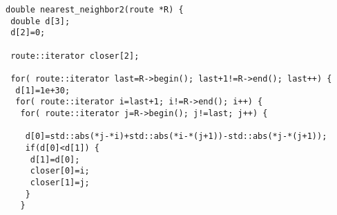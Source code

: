 \documentclass[a4paper, 12pt]{article}
\begin{document}
{\small
\begin{verbatim}
double nearest_neighbor2(route *R) {                                                                                                                            
 double d[3];                                                                                                                                                   
 d[2]=0;                                                                                                                                                        
                                                                                                                                                                
 route::iterator closer[2];                                                                                                                                     
                                                                                                                                                                
 for( route::iterator last=R->begin(); last+1!=R->end(); last++) {                                                                                              
  d[1]=1e+30;                                                                                                                                                   
  for( route::iterator i=last+1; i!=R->end(); i++) {                                                                                                            
   for( route::iterator j=R->begin(); j!=last; j++) {                                                                                                           
                                                                                                                                                                
    d[0]=std::abs(*j-*i)+std::abs(*i-*(j+1))-std::abs(*j-*(j+1));                                                                                               
    if(d[0]<d[1]) {                                                                                                                                             
     d[1]=d[0];                                                                                                                                                 
     closer[0]=i;                                                                                                                                               
     closer[1]=j;                                                                                                                                               
    }                                                                                                                                                           
   }                                                                                                                                                            
                                                                                                                                                                

\end{verbatim}}
\end{document}

